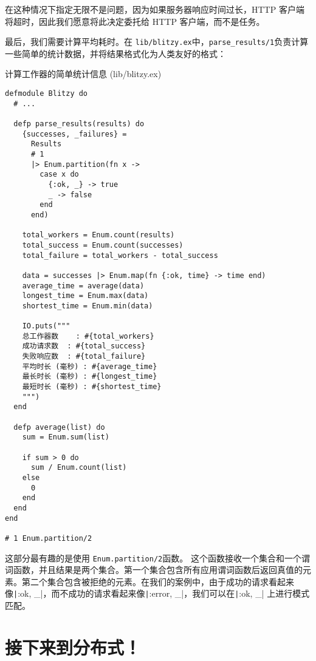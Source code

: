 在这种情况下指定无限不是问题，因为如果服务器响应时间过长，HTTP
客户端将超时，因此我们愿意将此决定委托给 HTTP 客户端，而不是任务。

最后，我们需要计算平均耗时。在 \texttt{lib/blitzy.ex}中，\texttt{parse\_results/1}负责计算一些简单的统计数据，并将结果格式化为人类友好的格式：

\begin{code}{计算工作器的简单统计信息 (lib/blitzy.ex)}

\begin{verbatim}
defmodule Blitzy do
  # ...

  defp parse_results(results) do
    {successes, _failures} =
      Results
      # 1
      |> Enum.partition(fn x ->
        case x do
          {:ok, _} -> true
          _ -> false
        end
      end)

    total_workers = Enum.count(results)
    total_success = Enum.count(successes)
    total_failure = total_workers - total_success

    data = successes |> Enum.map(fn {:ok, time} -> time end)
    average_time = average(data)
    longest_time = Enum.max(data)
    shortest_time = Enum.min(data)

    IO.puts("""
    总工作器数    : #{total_workers}
    成功请求数  : #{total_success}
    失败响应数  : #{total_failure}
    平均时长 (毫秒) : #{average_time}
    最长时长 (毫秒) : #{longest_time}
    最短时长 (毫秒) : #{shortest_time}
    """)
  end

  defp average(list) do
    sum = Enum.sum(list)

    if sum > 0 do
      sum / Enum.count(list)
    else
      0
    end
  end
end

# 1 Enum.partition/2
\end{verbatim}
\label{lst:compute_simple_statistics}
\end{code}

这部分最有趣的是使用 \texttt{Enum.partition/2}函数。
这个函数接收一个集合和一个谓词函数，并且结果是两个集合。第一个集合包含所有应用谓词函数后返回真值的元素。第二个集合包含被拒绝的元素。在我们的案例中，由于成功的请求看起来像\texttt|{:ok, _}|，而不成功的请求看起来像\texttt|{:error, _}|，我们可以在\texttt|{:ok, _}| 上进行模式匹配。

\section{接下来到分布式！}

